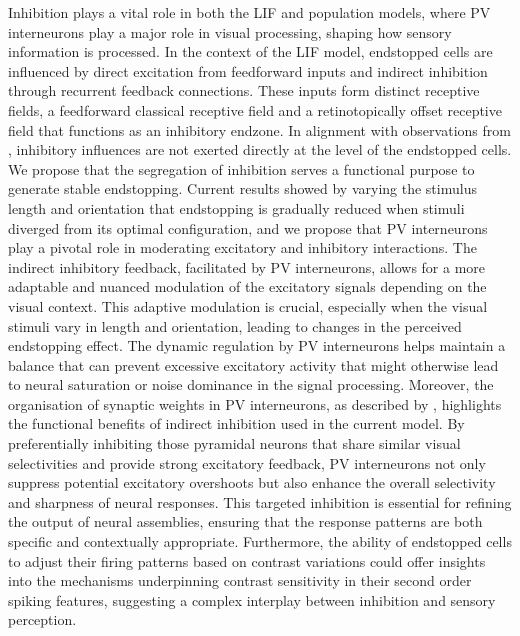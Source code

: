 \documentclass[12pt]{article}
\begin{document}
Inhibition plays a vital role in both the LIF and population models, where PV interneurons play a major role in visual processing, shaping how sensory information is processed. In the context of the LIF model, endstopped cells are influenced by direct excitation from feedforward inputs and indirect inhibition through recurrent feedback connections. These inputs form distinct receptive fields, a feedforward classical receptive field and a retinotopically offset receptive field that functions as an inhibitory endzone. In alignment with observations from \textcite{sillitoContributionExcitatoryInhibitory1977}, inhibitory influences are not exerted directly at the level of the endstopped cells. We propose that the segregation of inhibition serves a functional purpose to generate stable endstopping. Current results showed by varying the stimulus length and orientation that endstopping is gradually reduced when stimuli diverged from its optimal configuration, and we propose that PV interneurons play a pivotal role in moderating excitatory and inhibitory interactions. The indirect inhibitory feedback, facilitated by PV interneurons, allows for a more adaptable and nuanced modulation of the excitatory signals depending on the visual context. This adaptive modulation is crucial, especially when the visual stimuli vary in length and orientation, leading to changes in the perceived endstopping effect. The dynamic regulation by PV interneurons helps maintain a balance that can prevent excessive excitatory activity that might otherwise lead to neural saturation or noise dominance in the signal processing.
\bigbreak
Moreover, the organisation of synaptic weights in PV interneurons, as described by \textcite{znamenskiyFunctionalSpecificityRecurrent2024}, highlights the functional benefits of indirect inhibition used in the current model. By preferentially inhibiting those pyramidal neurons that share similar visual selectivities and provide strong excitatory feedback, PV interneurons not only suppress potential excitatory overshoots but also enhance the overall selectivity and sharpness of neural responses. This targeted inhibition is essential for refining the output of neural assemblies, ensuring that the response patterns are both specific and contextually appropriate. Furthermore, the ability of endstopped cells to adjust their firing patterns based on contrast variations could offer insights into the mechanisms underpinning contrast sensitivity in their second order spiking features, suggesting a complex interplay between inhibition and sensory perception.
\end{document}
